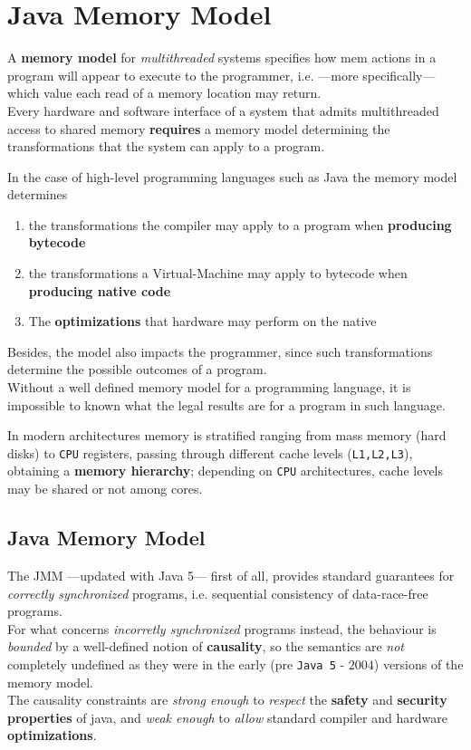 \chapter{Java Memory Model}
A \textbf{memory model} for \textit{multithreaded} systems specifies how mem actions in a program will appear to execute to the programmer, i.e. {---}more specifically{---} which value each read of a memory location may return.\\
Every hardware and software interface of a system that admits multithreaded access to shared memory \textbf{requires} a memory model determining the transformations that the system can apply to a program.

{In the case of high-level programming languages such as Java the memory model determines\ns
\begin{enumerate}
   \item the transformations the compiler may apply to a program when \textbf{producing bytecode}
   \item the transformations a Virtual-Machine may apply to bytecode when \textbf{producing native code}
   \item The \textbf{optimizations} that hardware may perform on the native
\end{enumerate}}
Besides, the model also impacts the programmer,
since such transformations determine the possible outcomes of a program.\\
Without a well defined memory model for a programming language, it is impossible to known what the legal results are for a program in such language.

{In modern architectures memory is stratified ranging from mass memory (hard disks) to \texttt{CPU} registers, passing through different cache levels (\texttt{L1,L2,L3}),
obtaining a \textbf{memory hierarchy};
depending on \texttt{CPU} architectures, cache levels may be shared or not among cores.}

\section{Java Memory Model}
The JMM ---updated with Java 5--- first of all, provides standard guarantees for \textit{correctly synchronized} programs, i.e. sequential consistency of data-race-free programs.\\
For what concerns \textit{incorretly synchronized} programs instead, the behaviour is \textit{bounded} by a well-defined notion of \textbf{causality},
so the semantics are \textit{not} completely undefined as they were in the early (pre \texttt{Java 5} - $2004$) versions of the memory model.\\
The causality constraints are \textit{strong enough} to \textit{respect} the \textbf{safety} and \textbf{security} \textbf{properties} of java,
and \textit{weak enough} to \textit{allow} standard compiler and hardware \textbf{optimizations}.

